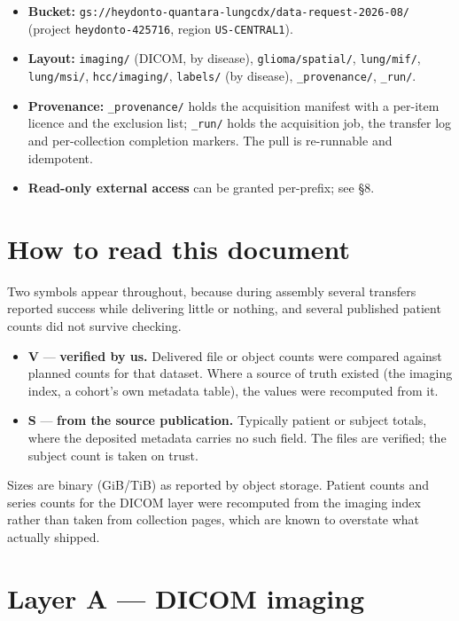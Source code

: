 \documentclass[11pt,a4paper]{article}
\newcommand{\ver}{\textcolor{qgreen}{\textbf{V}}}
\newcommand{\src}{\textcolor{qgrey}{\textbf{S}}}
\begin{document}
\begin{itemize}[leftmargin=1.4em,nosep]
\item \textbf{Bucket:} \texttt{gs://heydonto-quantara-lungcdx/data-request-2026-08/}
(project \texttt{heydonto-425716}, region \texttt{US-CENTRAL1}).
\item \textbf{Layout:} \texttt{imaging/} (DICOM, by disease), \texttt{glioma/spatial/},
\texttt{lung/mif/}, \texttt{lung/msi/}, \texttt{hcc/imaging/}, \texttt{labels/} (by
disease), \texttt{\_provenance/}, \texttt{\_run/}.
\item \textbf{Provenance:} \texttt{\_provenance/} holds the acquisition manifest with a
per-item licence and the exclusion list; \texttt{\_run/} holds the acquisition job, the
transfer log and per-collection completion markers. The pull is re-runnable and
idempotent.
\item \textbf{Read-only external access} can be granted per-prefix; see \S8.
\end{itemize}

\section{How to read this document}

Two symbols appear throughout, because during assembly several transfers reported success
while delivering little or nothing, and several published patient counts did not survive
checking.

\begin{itemize}[leftmargin=1.4em,nosep]
\item \ver{} --- \textbf{verified by us.} Delivered file or object counts were compared
against planned counts for that dataset. Where a source of truth existed (the imaging
index, a cohort's own metadata table), the values were recomputed from it.
\item \src{} --- \textbf{from the source publication.} Typically patient or subject
totals, where the deposited metadata carries no such field. The files are verified; the
subject count is taken on trust.
\end{itemize}

\noindent
Sizes are binary (GiB/TiB) as reported by object storage. Patient counts and series
counts for the DICOM layer were recomputed from the imaging index rather than taken from
collection pages, which are known to overstate what actually shipped.

\section{Layer A --- DICOM imaging}
\end{document}
